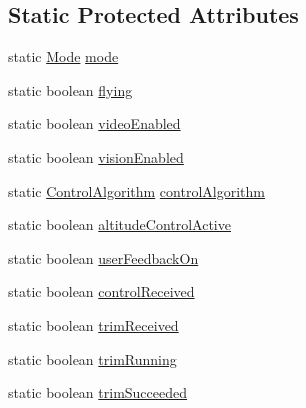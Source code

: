 \subsection*{Static Protected Attributes}
\begin{DoxyCompactItemize}
\item 
static \hyperlink{enumworkspace_1_1_a_r_drone_nav_data_1_1src_1_1controller_1_1_mode}{Mode} \hyperlink{classworkspace_1_1_a_r_drone_nav_data_1_1src_1_1controller_1_1_drone_test_a2a8ad2faa7de6fe34059387c6203324b}{mode}
\item 
static boolean \hyperlink{classworkspace_1_1_a_r_drone_nav_data_1_1src_1_1controller_1_1_drone_test_ac917d3edaa86d8c0b6db911bb3e07551}{flying}
\item 
static boolean \hyperlink{classworkspace_1_1_a_r_drone_nav_data_1_1src_1_1controller_1_1_drone_test_ae3134418feba3bee7f2bdd2eaa6030e2}{video\+Enabled}
\item 
static boolean \hyperlink{classworkspace_1_1_a_r_drone_nav_data_1_1src_1_1controller_1_1_drone_test_a866fc89ff705747dce53ab8eb78005bc}{vision\+Enabled}
\item 
static \hyperlink{enumworkspace_1_1_a_r_drone_nav_data_1_1src_1_1controller_1_1_control_algorithm}{Control\+Algorithm} \hyperlink{classworkspace_1_1_a_r_drone_nav_data_1_1src_1_1controller_1_1_drone_test_a7745982aa5edaa0602d42c16c4161eaa}{control\+Algorithm}
\item 
static boolean \hyperlink{classworkspace_1_1_a_r_drone_nav_data_1_1src_1_1controller_1_1_drone_test_a4ee03462425a581ac02e382af53e8f25}{altitude\+Control\+Active}
\item 
static boolean \hyperlink{classworkspace_1_1_a_r_drone_nav_data_1_1src_1_1controller_1_1_drone_test_a6e19c9fdd46bb86c96abddcebc92f353}{user\+Feedback\+On}
\item 
static boolean \hyperlink{classworkspace_1_1_a_r_drone_nav_data_1_1src_1_1controller_1_1_drone_test_a4314f49b3a2ceab3ed1467c7200377c5}{control\+Received}
\item 
static boolean \hyperlink{classworkspace_1_1_a_r_drone_nav_data_1_1src_1_1controller_1_1_drone_test_a3a00dcc76d693e172c428a2eafa81ecd}{trim\+Received}
\item 
static boolean \hyperlink{classworkspace_1_1_a_r_drone_nav_data_1_1src_1_1controller_1_1_drone_test_a9867dd8d9078528234f16bc614a4c802}{trim\+Running}
\item 
static boolean \hyperlink{classworkspace_1_1_a_r_drone_nav_data_1_1src_1_1controller_1_1_drone_test_aa4cc49528d13ce11544c889e57989b87}{trim\+Succeeded}

\end{DoxyCompactItemize}
